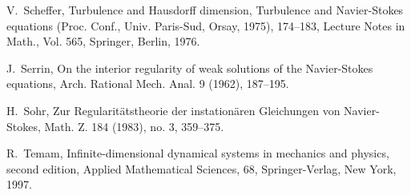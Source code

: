 \documentclass[12pt]{amsart}
\theoremstyle{remark}
\begin{document}
\begin{thebibliography}{999}
V.~Scheffer,
Turbulence and Hausdorff dimension, 
Turbulence and Navier-Stokes equations
(Proc. Conf., Univ. Paris-Sud, Orsay, 1975), 174--183,
Lecture Notes in Math., Vol. 565, Springer, Berlin, 1976. 

J.~Serrin,
On the interior regularity of weak solutions of the Navier-Stokes equations,
Arch. Rational Mech. Anal.  9  (1962), 187--195.

H.~Sohr,
Zur Regularit\"atstheorie der instation\"aren Gleichungen von Navier-Stokes, 
Math. Z.  184  (1983),  no. 3, 359--375.

R.~Temam,
Infinite-dimensional dynamical systems in mechanics and physics,
second edition, Applied Mathematical Sciences, 68,
Springer-Verlag, New York, 1997.

\end{thebibliography}
\end{document}
